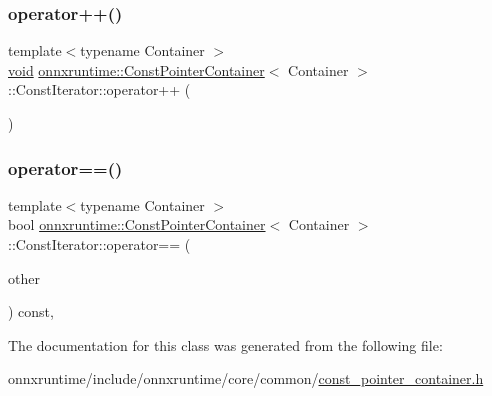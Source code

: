 \mbox{\label{classonnxruntime_1_1ConstPointerContainer_1_1ConstIterator_abc80097bc9eb5285206a5820d833b259}} 
\subsubsection{\texorpdfstring{operator++()}{operator++()}}
{\footnotesize\ttfamily template$<$typename Container $>$ \\
\mbox{\hyperlink{mlasi_8h_a88f941d423cb2a819b70a1358982b1a6}{void}} \mbox{\hyperlink{classonnxruntime_1_1ConstPointerContainer}{onnxruntime\+::\+Const\+Pointer\+Container}}$<$ Container $>$\+::Const\+Iterator\+::operator++ (\begin{DoxyParamCaption}{ }\end{DoxyParamCaption})\hspace{0.3cm}{\ttfamily [inline]}}

\mbox{\label{classonnxruntime_1_1ConstPointerContainer_1_1ConstIterator_a3ac7e9a7176851d89f4d2b0269cf473f}} 
\subsubsection{\texorpdfstring{operator==()}{operator==()}}
{\footnotesize\ttfamily template$<$typename Container $>$ \\
bool \mbox{\hyperlink{classonnxruntime_1_1ConstPointerContainer}{onnxruntime\+::\+Const\+Pointer\+Container}}$<$ Container $>$\+::Const\+Iterator\+::operator== (\begin{DoxyParamCaption}\item[{const \mbox{\hyperlink{classonnxruntime_1_1ConstPointerContainer_1_1ConstIterator}{Const\+Iterator}} \&}]{other }\end{DoxyParamCaption}) const\hspace{0.3cm}{\ttfamily [inline]}, {\ttfamily [noexcept]}}



The documentation for this class was generated from the following file\+:\begin{DoxyCompactItemize}
\item 
onnxruntime/include/onnxruntime/core/common/\mbox{\hyperlink{const__pointer__container_8h}{const\+\_\+pointer\+\_\+container.\+h}}\end{DoxyCompactItemize}
